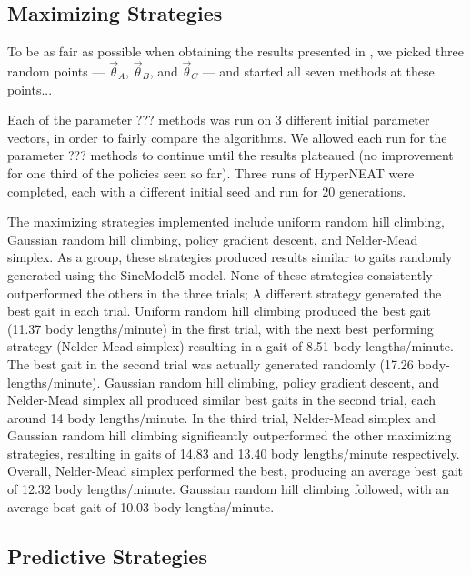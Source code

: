 \subsection{Maximizing Strategies}


To be as fair as possible when obtaining the results presented in
, we picked three random points --- $\vec{\theta}_A$,
$\vec{\theta}_B$, and $\vec{\theta}_C$ --- and started all seven
methods at these points...

Each of the parameter ??? methods was run on 3 different initial
parameter vectors, in order to fairly compare the algorithms. We allowed 
each run for the parameter ??? methods to
continue until the results plateaued (no improvement for one third of
the policies seen so far). Three runs of HyperNEAT were completed,
each with a different initial seed and run for 20 generations.

\edit{$\wedge\wedge\wedge\wedge\wedge\wedge\wedge\wedge$}


The maximizing strategies implemented include uniform random hill
climbing, Gaussian random hill climbing, policy gradient descent, and
Nelder-Mead simplex. As a group, these strategies produced results
similar to gaits randomly generated using the SineModel5 model. None
of these strategies consistently outperformed the others in the three
trials; A different strategy generated the best gait in each
trial. Uniform random hill climbing produced the best gait (11.37 body
lengths/minute) in the first trial, with the next best performing
strategy (Nelder-Mead simplex) resulting in a gait of 8.51 body
lengths/minute. The best gait in the second trial was actually
generated randomly (17.26 body-lengths/minute). Gaussian random hill
climbing, policy gradient descent, and Nelder-Mead simplex all
produced similar best gaits in the second trial, each around 14 body
lengths/minute. In the third trial, Nelder-Mead simplex and Gaussian
random hill climbing significantly outperformed the other maximizing
strategies, resulting in gaits of 14.83 and 13.40 body lengths/minute
respectively. Overall, Nelder-Mead simplex performed the best,
producing an average best gait of 12.32 body lengths/minute. Gaussian
random hill climbing followed, with an average best gait of 10.03 body
lengths/minute.



\subsection{Predictive Strategies}

